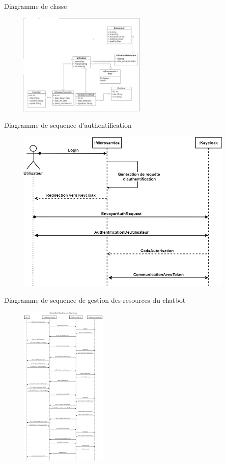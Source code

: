 \documentclass[aspectratio=169]{beamer}
\begin{document}
\begin{frame}{Diagramme de classe}

    \begin{figure}[htpb]
        \centering
        \includegraphics[height=5cm]{pic/sprint2-class.png}
    \end{figure}
\end{frame}

\begin{frame}{Diagramme de sequence d'authentification}
    \begin{figure}[htpb]
        \centering
        \includegraphics[height=8cm]{pic/keycloak-seq.png}
    \end{figure}
\end{frame}

\begin{frame}{Diagramme de sequence de gestion des resources du chatbot}
    \begin{figure}[htpb]
        \centering
        \includegraphics[height=8cm]{pic/chat-res-seq.png}
    \end{figure}
\end{frame}
\end{document}
